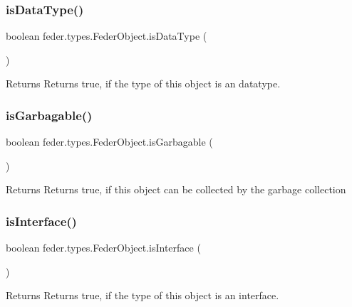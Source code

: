 \subsubsection{\texorpdfstring{is\+Data\+Type()}{isDataType()}}
{\footnotesize\ttfamily boolean feder.\+types.\+Feder\+Object.\+is\+Data\+Type (\begin{DoxyParamCaption}{ }\end{DoxyParamCaption})}

\begin{DoxyReturn}{Returns}
Returns true, if the type of this object is an datatype. 
\end{DoxyReturn}
\mbox{\label{classfeder_1_1types_1_1FederObject_a2d4a3bbd8a43871e08b9fe418a3ce2ad}} 
\subsubsection{\texorpdfstring{is\+Garbagable()}{isGarbagable()}}
{\footnotesize\ttfamily boolean feder.\+types.\+Feder\+Object.\+is\+Garbagable (\begin{DoxyParamCaption}{ }\end{DoxyParamCaption})}

\begin{DoxyReturn}{Returns}
Returns true, if this object can be collected by the garbage collection 
\end{DoxyReturn}
\mbox{\label{classfeder_1_1types_1_1FederObject_a02dd0040b45efef9ebc21015c04f9f68}} 
\subsubsection{\texorpdfstring{is\+Interface()}{isInterface()}}
{\footnotesize\ttfamily boolean feder.\+types.\+Feder\+Object.\+is\+Interface (\begin{DoxyParamCaption}{ }\end{DoxyParamCaption})}

\begin{DoxyReturn}{Returns}
Returns true, if the type of this object is an interface. 
\end{DoxyReturn}
\mbox{\label{classfeder_1_1types_1_1FederObject_a45257f7c53f6959f12bf85b32137772b}} 
